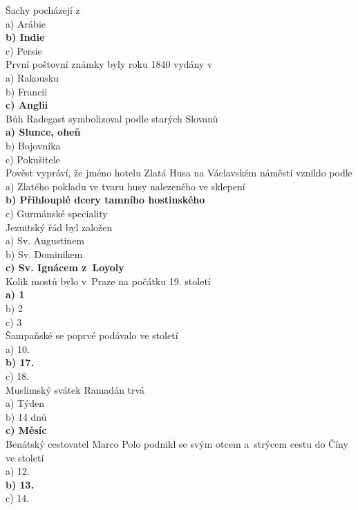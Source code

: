 \begin{multicols}{\value{columnsthindata}}
\noindent
Šachy pocházejí z \\
a) Arábie\\
\textbf{b) Indie}\\
c) Persie\\

\noindent
První poštovní známky byly roku 1840 vydány v \\
a) Rakousku\\
b) Francii\\
\textbf{c) Anglii}\\

\noindent
Bůh Radegast symbolizoval podle starých Slovanů \\
\textbf{a) Slunce, oheň}\\
b) Bojovníka\\
c) Pokušitele\\

\noindent
Pověst vypráví, že jméno hotelu Zlatá Husa na Václavském náměstí 
vzniklo podle \\
a) Zlatého pokladu ve tvaru husy nalezeného ve sklepení\\
\textbf{b) Přihlouplé dcery tamního hostinského}\\
c) Gurmánské speciality\\

\noindent
Jezuitský řád byl založen \\
a) Sv. Augustinem\\
b) Sv. Dominikem\\
\textbf{c) Sv. Ignácem z~Loyoly}\\

\noindent
Kolik mostů bylo v~Praze na počátku 19. století\\
\textbf{a) 1}\\
b) 2\\
c) 3\\

\noindent
Šampaňské se poprvé podávalo ve století \\
a) 10.\\
\textbf{b) 17.}\\
c) 18.\\

\noindent
Muslimský svátek Ramadán trvá\\
a) Týden\\
b) 14 dnů\\
\textbf{c) Měsíc}\\

\noindent
Benátský cestovatel Marco Polo podnikl se svým otcem a~strýcem 
cestu do Číny ve století\\
a) 12.\\
\textbf{b) 13.}\\
c) 14.\\


\end{multicols}
